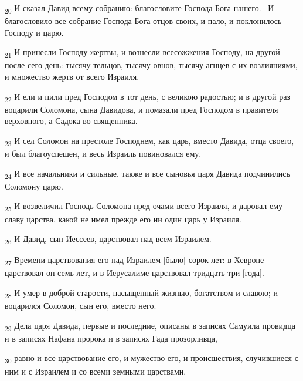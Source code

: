 \begin{tcolorbox}
\textsubscript{20} И сказал Давид всему собранию: благословите Господа Бога нашего. --И благословило все собрание Господа Бога отцов своих, и пало, и поклонилось Господу и царю.
\end{tcolorbox}
\begin{tcolorbox}
\textsubscript{21} И принесли Господу жертвы, и вознесли всесожжения Господу, на другой после сего день: тысячу тельцов, тысячу овнов, тысячу агнцев с их возлияниями, и множество жертв от всего Израиля.
\end{tcolorbox}
\begin{tcolorbox}
\textsubscript{22} И ели и пили пред Господом в тот день, с великою радостью; и в другой раз воцарили Соломона, сына Давидова, и помазали пред Господом в правителя верховного, а Садока во священника.
\end{tcolorbox}
\begin{tcolorbox}
\textsubscript{23} И сел Соломон на престоле Господнем, как царь, вместо Давида, отца своего, и был благоуспешен, и весь Израиль повиновался ему.
\end{tcolorbox}
\begin{tcolorbox}
\textsubscript{24} И все начальники и сильные, также и все сыновья царя Давида подчинились Соломону царю.
\end{tcolorbox}
\begin{tcolorbox}
\textsubscript{25} И возвеличил Господь Соломона пред очами всего Израиля, и даровал ему славу царства, какой не имел прежде его ни один царь у Израиля.
\end{tcolorbox}
\begin{tcolorbox}
\textsubscript{26} И Давид, сын Иессеев, царствовал над всем Израилем.
\end{tcolorbox}
\begin{tcolorbox}
\textsubscript{27} Времени царствования его над Израилем [было] сорок лет: в Хевроне царствовал он семь лет, и в Иерусалиме царствовал тридцать три [года].
\end{tcolorbox}
\begin{tcolorbox}
\textsubscript{28} И умер в доброй старости, насыщенный жизнью, богатством и славою; и воцарился Соломон, сын его, вместо него.
\end{tcolorbox}
\begin{tcolorbox}
\textsubscript{29} Дела царя Давида, первые и последние, описаны в записях Самуила провидца и в записях Нафана пророка и в записях Гада прозорливца,
\end{tcolorbox}
\begin{tcolorbox}
\textsubscript{30} равно и все царствование его, и мужество его, и происшествия, случившиеся с ним и с Израилем и со всеми земными царствами.
\end{tcolorbox}

